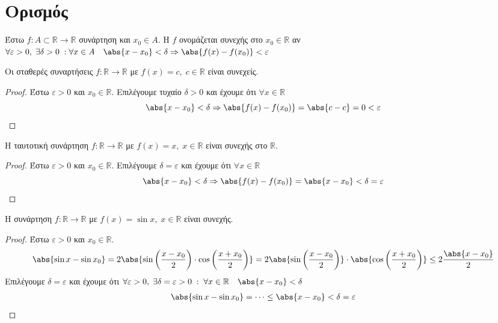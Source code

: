 \documentclass[main.tex]{subfiles}
\begin{document}
\section{Ορισμός}

\begin{dfn}
    Έστω $ f \colon A \subset \mathbb{R} \to \mathbb{R} $ συνάρτηση και $ x_{0} \in A $. 
    Η $f$ ονομάζεται συνεχής στο $ x_{0} \in \mathbb{R} $ αν $ \forall \varepsilon >0, 
    \; \exists \delta >0 \; : \forall x \in A \quad \abs{x- x_{0}} < \delta 
    \Rightarrow \abs{f(x) - f(x_{0})} < \varepsilon $
\end{dfn}

\begin{prop}
    Οι σταθερές συναρτήσεις $ f \colon \mathbb{R} \to \mathbb{R} $ με $ f(x)=c, \; c \in 
    \mathbb{R}$ είναι συνεχείς.
\end{prop}
\begin{proof}
\item {}
    Έστω $ \varepsilon >0 $ και $ x_{0} \in \mathbb{R} $. 
    Επιλέγουμε τυχαίο $ \delta >0 $ και έχουμε ότι $ \forall x \in \mathbb{R} $ 
    \[
        \abs{x- x_{0}} < \delta \Rightarrow \abs{f(x)- f(x_{0})} = \abs{c-c} = 0 < 
        \varepsilon 
    \]
\end{proof}

\begin{prop}
    Η ταυτοτική συνάρτηση $ f \colon \mathbb{R} \to \mathbb{R} $ με $ f(x)=x, \; x \in 
    \mathbb{R}$ είναι συνεχής στο $ \mathbb{R} $.
\end{prop}
\begin{proof}
\item {}
    Έστω $ \varepsilon >0 $ και $ x_{0} \in \mathbb{R} $. 
    Επιλέγουμε $ \delta = \varepsilon $ και έχουμε ότι $ \forall x \in \mathbb{R} $ 
    \[
        \abs{x- x_{0}} < \delta \Rightarrow \abs{f(x)-f(x_{0})} = \abs{x- x_{0}} < 
        \delta = \varepsilon
    \]
\end{proof}

\begin{prop}
    Η συνάρτηση $ f \colon \mathbb{R} \to \mathbb{R} $ με $ f(x)= \sin{x}, \; x \in 
    \mathbb{R}$ είναι συνεχής.
\end{prop}
\begin{proof}
\item {}
    Έστω $ \varepsilon >0 $ και $ x_{0} \in \mathbb{R} $. 
    \[
        \abs{\sin{x} - \sin{x_{0}}} = 2 \abs{\sin{\left(\frac{x - x_{0}}{2}\right)} 
        \cdot \cos{\left(\frac{x+ x_{0}}{2}\right)}} = 2 
        \abs{\sin{\left(\frac{x- x_{0}}{2}\right)}} \cdot 
        \abs{\cos{\left(\frac{x+ x_{0}}{2}\right)}} \leq 2 \frac{\abs{x- x_{0}}}{2}
    \]
    Επιλέγουμε $ \delta = \varepsilon $ και έχουμε ότι $ \forall \varepsilon >0, \; 
    \exists \delta = \varepsilon > 0 \; : \; \forall x \in \mathbb{R} \quad 
    \abs{x- x_{0}} < \delta $
    \begin{align*}
        \abs{\sin{x} - \sin{x_{0}}} = \cdots \leq \abs{x - x_{0}} < \delta = 
        \varepsilon  
    \end{align*} 
\end{proof}
\end{document}
